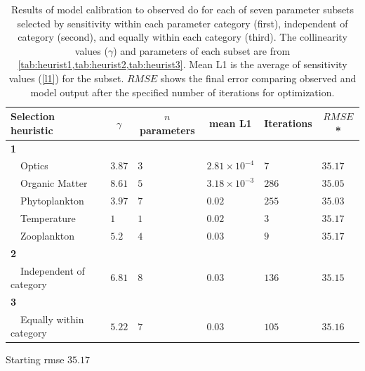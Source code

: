 \documentclass[review]{elsarticle}\usepackage[]{graphicx}\usepackage[]{color}
\begin{document}
\begin{table}[!tbp]
{\scriptsize
\caption{Results of model calibration to observed \ac{do} for each of seven parameter subsets selected by sensitivity within each parameter category (first), independent of category (second), and equally within each category (third). The collinearity values ($\gamma$) and parameters of each subset are from \cref{tab:heurist1,tab:heurist2,tab:heurist3}.  Mean L1 is the average of sensitivity values (\cref{l1}) for the subset.  $RMSE$ shows the final error comparing observed and model output after the specified number of iterations for optimization.\label{tab:calib}} 
\begin{center}
\begin{tabular}{llllll}
\hline\hline
\multicolumn{1}{l}{Selection heuristic}&\multicolumn{1}{c}{$\gamma$}&\multicolumn{1}{c}{$n$ parameters}&\multicolumn{1}{c}{mean L1}&\multicolumn{1}{c}{Iterations}&\multicolumn{1}{c}{$RMSE$*}\tabularnewline
\hline
{\bfseries 1}&&&&&\tabularnewline
~~Optics&$3.87$&$3$&$2.81\times 10^{-4}$&$7$&$35.17$\tabularnewline
~~Organic Matter&$8.61$&$5$&$3.18\times 10^{-3}$&$286$&$35.05$\tabularnewline
~~Phytoplankton&$3.97$&$7$&$0.02$&$255$&$35.03$\tabularnewline
~~Temperature&$1$&$1$&$0.02$&$3$&$35.17$\tabularnewline
~~Zooplankton&$5.2$&$4$&$0.03$&$9$&$35.17$\tabularnewline
\hline
{\bfseries 2}&&&&&\tabularnewline
~~Independent of category&$6.81$&$8$&$0.03$&$136$&$35.15$\tabularnewline
\hline
{\bfseries 3}&&&&&\tabularnewline
~~Equally within category&$5.22$&$7$&$0.03$&$105$&$35.16$\tabularnewline
\hline
\end{tabular}\end{center}}
\footnotesize *Starting \ac{rmse} $35.17$\end{table}
\end{document}
